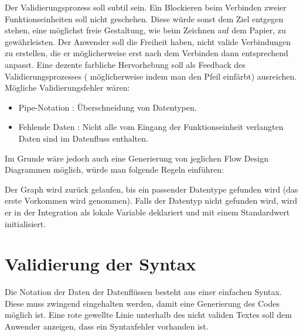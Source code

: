 Der Validierungsprozess soll subtil sein. Ein Blockieren beim Verbinden zweier Funktionseinheiten soll nicht geschehen. Diese würde sonst dem Ziel entgegen stehen,
eine möglichst freie Gestaltung, wie beim Zeichnen auf dem Papier, zu
gewährleisten. Der Anwender soll die Freiheit haben, nicht valide Verbindungen
zu erstellen, die er möglicherweise erst nach dem Verbinden dann entsprechend
anpasst. Eine dezente farbliche Hervorhebung soll als Feedback des
Validierungsprozesses ( möglicherweise indem man den Pfeil einfärbt) ausreichen. Mögliche Validierungsfehler wären:
\begin{itemize}
\item Pipe-Notation : Überschneidung von Datentypen.
\item Fehlende Daten : Nicht alle vom Eingang der Funktionseinheit verlangten Daten
sind im Datenfluss enthalten.
\end{itemize}

Im Grunde wäre jedoch auch eine Generierung von jeglichen Flow Design Diagrammen
möglich, würde man folgende Regeln einführen:

Der Graph wird zurück gelaufen, bis ein passender Datentype
gefunden wird (das erste Vorkommen wird genommen). Falls der Datentyp nicht
gefunden wird, wird er in der Integration als lokale Variable deklariert und mit einem Standardwert initialisiert.


\section{Validierung der Syntax}

Die Notation der Daten der Datenflüssen besteht aus einer einfachen Syntax. Diese muss zwingend eingehalten
 werden, damit eine Generierung des Codes möglich ist.
 Eine rote gewellte Linie unterhalb des nicht validen Textes soll dem Anwender
 anzeigen, dass ein Syntaxfehler vorhanden ist.

